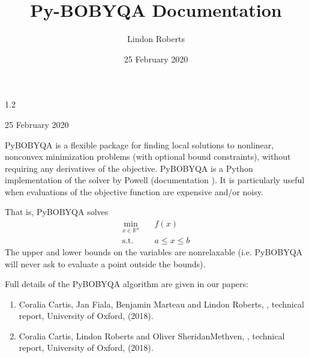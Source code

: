 \documentclass[letterpaper,10pt,english]{sphinxmanual}
\title{Py-BOBYQA Documentation}
\date{25 February 2020}
\author{Lindon Roberts}
\begin{document}
\pagestyle{empty}
\sphinxmaketitle
\pagestyle{plain}
\sphinxtableofcontents
\pagestyle{normal}
\label{\detokenize{index::doc}}


 1.2

 25 February 2020

 

Py\sphinxhyphen{}BOBYQA is a flexible package for finding local solutions to nonlinear, nonconvex minimization problems (with optional bound constraints), without requiring any derivatives of the objective. Py\sphinxhyphen{}BOBYQA is a Python implementation of the  solver by Powell (documentation ). It is particularly useful when evaluations of the objective function are expensive and/or noisy.

That is, Py\sphinxhyphen{}BOBYQA solves
\begin{equation*}
\begin{split}\min_{x\in\mathbb{R}^n}  &\quad  f(x)\\
\text{s.t.} &\quad  a \leq x \leq b\end{split}
\end{equation*}
The upper and lower bounds on the variables are non\sphinxhyphen{}relaxable (i.e. Py\sphinxhyphen{}BOBYQA will never ask to evaluate a point outside the bounds).

Full details of the Py\sphinxhyphen{}BOBYQA algorithm are given in our papers:
\begin{enumerate}
%
\item {} 
Coralia Cartis, Jan Fiala, Benjamin Marteau and Lindon Roberts, , technical report, University of Oxford, (2018).

\item {} 
Coralia Cartis, Lindon Roberts and Oliver Sheridan\sphinxhyphen{}Methven, , technical report, University of Oxford, (2018).

\end{enumerate}
\end{document}
